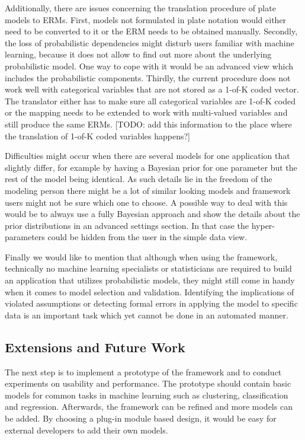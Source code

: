 Additionally, there are issues concerning the translation procedure of plate models to ERMs. First, models not formulated in plate notation would either need to be converted to it or the ERM needs to be obtained manually. Secondly, the loss of probabilistic dependencies might disturb users familiar with machine learning, because it does not allow to find out more about the underlying probabilistic model. One way to cope with it would be an advanced view which includes the probabilistic components. Thirdly, the current procedure does not work well with categorical variables that are not stored as a 1-of-K coded vector. The translator either has to make sure all categorical variables are 1-of-K coded or the mapping needs to be extended to work with multi-valued variables and still produce the same ERMs. [TODO: add this information to the place where the translation of 1-of-K coded variables happens?]

Difficulties might occur when there are several models for one application that slightly differ, for example by having a Bayesian prior for one parameter but the rest of the model being identical. As such details lie in the freedom of the modeling person there might be a lot of similar looking models and framework users might not be sure which one to choose. A possible way to deal with this would be to always use a fully Bayesian approach and show the details about the prior distributions in an advanced settings section. In that case the hyper-parameters could be hidden from the user in the simple data view.

Finally we would like to mention that although when using the framework, technically no machine learning specialists or statisticians are required to build an application that utilizes probabilistic models, they might still come in handy when it comes to model selection and validation. Identifying the implications of violated assumptions or detecting formal errors in applying the model to specific data is an important task which yet cannot be done in an automated manner.

\subsection{Extensions and Future Work}

The next step is to implement a prototype of the framework and to conduct experiments on usability and performance. The prototype should contain basic models for common tasks in machine learning such as clustering, classification and regression. Afterwards, the framework can be refined and more models can be added. By choosing a plug-in module based design, it would be easy for external developers to add their own models.

